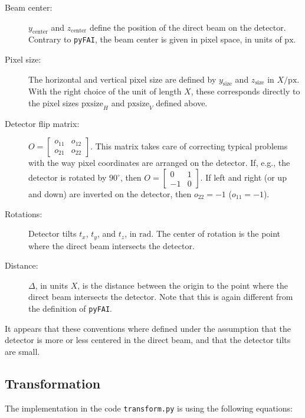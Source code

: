 \documentclass[12pt]{article}
\begin{document}
\begin{description}
\item[Beam center:] $y_{\mathrm{center}}$ and $z_{\mathrm{center}}$
  define the position of the direct beam on the detector. Contrary to
  \texttt{pyFAI}, the beam center is given in pixel space, in units of
  $\mathrm{px}$.

\item[Pixel size:] The horizontal and vertical pixel size are defined
  by $y_{\mathrm{size}}$ and $z_{\mathrm{size}}$ in
  ${X}/{\mathrm{px}}$. With the right choice of the unit of length
  $X$, these corresponds directly to the pixel sizes
  $\mathrm{pxsize}_H$ and $\mathrm{pxsize}_V$ defined above.

\item[Detector flip matrix:] $O = \begin{bmatrix} o_{11} & o_{12}
  \\ o_{21} & o_{22} \end{bmatrix}$. This matrix takes care of
  correcting typical problems with the way pixel coordinates are
  arranged on the detector. If, e.g., the detector is rotated by
  $90^{\circ}$, then $O=\begin{bmatrix} 0 & 1 \\ -1 &
  0\end{bmatrix}$. If left and right (or up and down) are inverted on
  the detector, then $o_{22} = -1$ ($o_{11}=-1$).
  
\item[Rotations:] Detector tilts $t_x$, $t_y$, and $t_z$, in
  $\mathrm{rad}$. The center of rotation is the point where the direct
  beam intersects the detector.
  
\item[Distance:] $\Delta$, in units $X$, is the distance between the origin
  to the point where the direct beam intersects the detector.  Note
  that this is again different from the definition of \texttt{pyFAI}.
\end{description}

It appears that these conventions where defined under the assumption
that the detector is more or less centered in the direct beam, and
that the detector tilts are small.

\subsection{Transformation}

The implementation in the code \texttt{transform.py} is using the
following equations:
\end{document}
